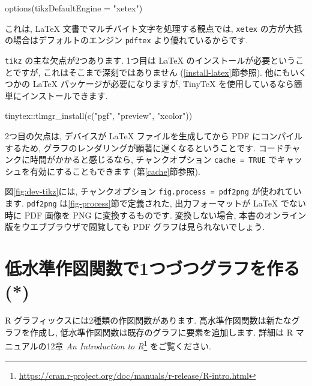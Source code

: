 \documentclass[
  11pt,
  lualatex,ja=standard,jafont=noto]{bxjsreport}
\newenvironment{Shaded}{\begin{snugshade}}{\end{snugshade}}
\newcommand{\AttributeTok}[1]{\textcolor[rgb]{0.77,0.63,0.00}{#1}}
\newcommand{\FunctionTok}[1]{\textcolor[rgb]{0.00,0.00,0.00}{#1}}
\newcommand{\NormalTok}[1]{#1}
\newcommand{\SpecialCharTok}[1]{\textcolor[rgb]{0.00,0.00,0.00}{#1}}
\newcommand{\StringTok}[1]{\textcolor[rgb]{0.31,0.60,0.02}{#1}}
\renewcommand{\href}[2]{#2\footnote{\url{#1}}}
\begin{document}
\begin{Shaded}
\begin{Highlighting}[numbers=left,,]
\FunctionTok{options}\NormalTok{(}\AttributeTok{tikzDefaultEngine =} \StringTok{"xetex"}\NormalTok{)}
\end{Highlighting}
\end{Shaded}

これは, LaTeX 文書でマルチバイト文字を処理する観点では, \texttt{xetex} の方が大抵の場合はデフォルトのエンジン \texttt{pdftex} より優れているからです.

\texttt{tikz} の主な欠点が2つあります. 1つ目は LaTeX のインストールが必要ということですが, これはそこまで深刻ではありません (\ref{install-latex}節参照). 他にもいくつかの LaTeX パッケージが必要になりますが, TinyTeX を使用しているなら簡単にインストールできます.

\begin{Shaded}
\begin{Highlighting}[numbers=left,,]
\NormalTok{tinytex}\SpecialCharTok{::}\FunctionTok{tlmgr\_install}\NormalTok{(}\FunctionTok{c}\NormalTok{(}\StringTok{"pgf"}\NormalTok{, }\StringTok{"preview"}\NormalTok{, }\StringTok{"xcolor"}\NormalTok{))}
\end{Highlighting}
\end{Shaded}

2つ目の欠点は, デバイスが LaTeX ファイルを生成してから PDF にコンパイルするため, グラフのレンダリングが顕著に遅くなるということです. コードチャンクに時間がかかると感じるなら, チャンクオプション \texttt{cache = TRUE} でキャッシュを有効にすることもできます (第\ref{cache}節参照).

図\ref{fig:dev-tikz}には, チャンクオプション \texttt{fig.process = pdf2png} が使われています. \texttt{pdf2png} は\ref{fig-process}節で定義された, 出力フォーマットが LaTeX でない時に PDF 画像を PNG に変換するものです. 変換しない場合, 本書のオンライン版をウエブブラウザで閲覧しても PDF グラフは見られないでしょう.

\hypertarget{low-plots}{%
\section{低水準作図関数で1つづつグラフを作る (*)}\label{low-plots}}

R グラフィックスには2種類の作図関数があります. 高水準作図関数は新たなグラフを作成し, 低水準作図関数は既存のグラフに要素を追加します. 詳細は R マニュアルの12章 \href{https://cran.r-project.org/doc/manuals/r-release/R-intro.html}{\emph{An Introduction to R}} をご覧ください.
\end{document}
